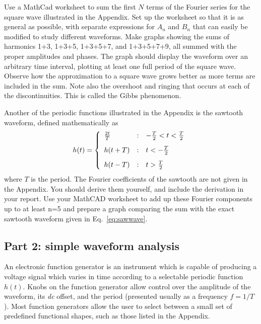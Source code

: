 \documentclass{revtex4}
\begin{document}
Use a MathCad worksheet to sum the first $N$ terms of the Fourier series
for the square wave illustrated in the Appendix. Set up the worksheet so that
it is as general as possible, with separate expressions for $A_n$ and $B_n$
that can easily be modified to study different waveforms.  Make graphs
showing the sums of harmonics 1+3, 1+3+5, 1+3+5+7, and 1+3+5+7+9, all
summed with the proper amplitudes and phases. The graph should display
the waveform over an arbitrary time interval, plotting at least one full
period of the square wave.  Observe how the approximation to a square wave
grows better as more terms are included in the sum.  Note also the overshoot
and ringing that occurs at each of the discontinuities.
This is called the Gibbs phenomenon\cite{Thompson92}.

Another of the periodic functions illustrated in the Appendix is the sawtooth
waveform, defined mathematically as
\begin{equation}
h(t) = \left\{\begin{array}{lcl}
\frac{2t}{T} &:& -\frac{T}{2}<t<\frac{T}{2} \vspace{3mm} \\
h(t+T) &:& t<-\frac{T}{2} \vspace{3mm} \\
h(t-T) &:& t>\frac{T}{2}
\end{array}
\right.
\label{eq:sawwave}
\end{equation}
where $T$ is the period.  The Fourier coefficients of the sawtooth are not
given in the Appendix.  You should derive them yourself, and include the
derivation in your report.  Use your MathCAD worksheet to add up these Fourier
components up to at least n=5 and prepare a graph comparing the sum with the
exact sawtooth waveform given in Eq.~\ref{eq:sawwave}.

\subsection{Part 2: simple waveform analysis}

An electronic function generator is an instrument which is capable of
producing a voltage signal which varies in time according to a selectable
periodic function $h(t)$.  Knobs on the function generator allow control
over the amplitude of the waveform, its {\em dc} offset, and the period
(presented usually as a frequency $f=1/T$).
Most function generators allow the user to select between a small set of
predefined functional shapes, such as those listed in the Appendix.
\end{document}
